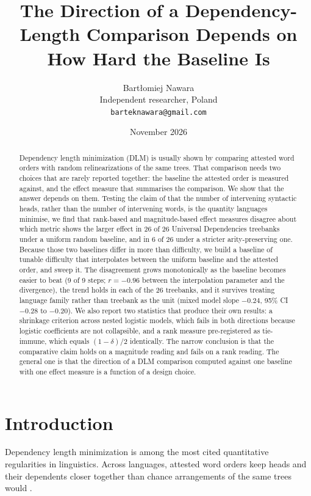 \documentclass[11pt]{article}
\title{The Direction of a Dependency-Length Comparison Depends on How Hard the Baseline Is}
\author{Bart{\l}omiej Nawara\\Independent researcher, Poland\\\texttt{barteknawara@gmail.com}}
\date{November 2026}
\begin{document}
\maketitle

\begin{abstract}
Dependency length minimization (DLM) is usually shown by comparing attested word orders with random relinearizations of the same trees. That comparison needs two choices that are rarely reported together: the baseline the attested order is measured against, and the effect measure that summarises the comparison. We show that the answer depends on them. Testing the claim of \citet{yadav2022reappraisal} that the number of intervening syntactic heads, rather than the number of intervening words, is the quantity languages minimise, we find that rank-based and magnitude-based effect measures disagree about which metric shows the larger effect in 26 of 26 Universal Dependencies treebanks under a uniform random baseline, and in 6 of 26 under a stricter arity-preserving one. Because those two baselines differ in more than difficulty, we build a baseline of tunable difficulty that interpolates between the uniform baseline and the attested order, and sweep it. The disagreement grows monotonically as the baseline becomes easier to beat (9 of 9 steps; $r=-0.96$ between the interpolation parameter and the divergence), the trend holds in each of the 26 treebanks, and it survives treating language family rather than treebank as the unit (mixed model slope $-0.24$, 95\% CI $-0.28$ to $-0.20$). We also report two statistics that produce their own results: a shrinkage criterion across nested logistic models, which fails in both directions because logistic coefficients are not collapsible, and a rank measure pre-registered as tie-immune, which equals $(1-\delta)/2$ identically. The narrow conclusion is that the comparative claim holds on a magnitude reading and fails on a rank reading. The general one is that the direction of a DLM comparison computed against one baseline with one effect measure is a function of a design choice.
\end{abstract}

\section{Introduction}

Dependency length minimization is among the most cited quantitative regularities in linguistics. Across languages, attested word orders keep heads and their dependents closer together than chance arrangements of the same trees would \citep{ferrericancho2004euclidean,liu2008dependency,gildea2010grammars,futrell2015largescale,temperley2018minimizing}.
\end{document}
